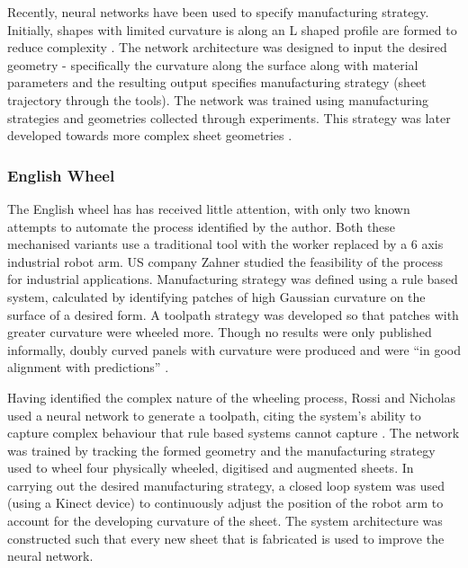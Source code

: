 Recently, neural networks have been used to specify manufacturing strategy. Initially, shapes with limited curvature is along an L shaped profile are formed to reduce complexity \citep{Opritescu2015AutomatedApproach}. The network architecture was designed to input the desired geometry - specifically the curvature along the surface along with material parameters and the resulting output specifies manufacturing strategy (sheet trajectory through the tools). The network was trained using manufacturing strategies and geometries collected through experiments. This strategy was later developed towards more complex sheet geometries \citep{Hartmann2019AnFree-forming}.

\subsubsection*{English Wheel}
The English wheel has has received little attention, with only two known attempts to automate the process identified by the author. Both these mechanised variants use a traditional tool with the worker replaced by a 6 axis industrial robot arm. US company Zahner studied the feasibility of the process for industrial applications. Manufacturing strategy was defined using a rule based system, calculated by identifying patches of high Gaussian curvature on the surface of a desired form. A toolpath strategy was developed so that patches with greater curvature were wheeled more. Though no results were only published informally, doubly curved panels with curvature were produced and were ``in good alignment with predictions'' \citep{Vazquez2017RoboticWheeling,Vazquez2017EfficientSurfaces}. %

Having identified the complex nature of the wheeling process, Rossi and Nicholas used a neural network to generate a toolpath, citing the system's ability to capture complex behaviour that rule based systems cannot capture \citep{Rossi2018ModellingWheel, Rossi2018Re/LearningSurfaces}. The network was trained by tracking the formed geometry and the manufacturing strategy used to wheel four physically wheeled, digitised and augmented sheets. %
In carrying out the desired manufacturing strategy, a closed loop system was used (using a Kinect device) %
to continuously adjust the position of the robot arm to account for the developing curvature of the sheet. The system architecture was constructed such that every new sheet that is fabricated is used to improve the neural network.

